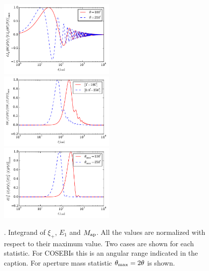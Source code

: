 \begin{figure}[htb]
\begin{center}
\includegraphics[width=0.5\textwidth]{figures/IntegKsip.pdf}\\
\includegraphics[width=0.5\textwidth]{figures/IntegCOSEBIs.pdf}\\
\includegraphics[width=0.5\textwidth]{figures/IntegMap.pdf}
\caption{ \label{fig:filters}. Integrand of $\xi_+$, $E_1$ and $M_{\rm ap}$.
All the values are normalized with respect to their maximum value. Two cases are shown for each statistic. 
For COSEBIs this is an angular range indicated in the caption. For aperture mass statistic $\theta_{\rm max}=2\theta$ is shown.
}
\end{center}
\end{figure}





